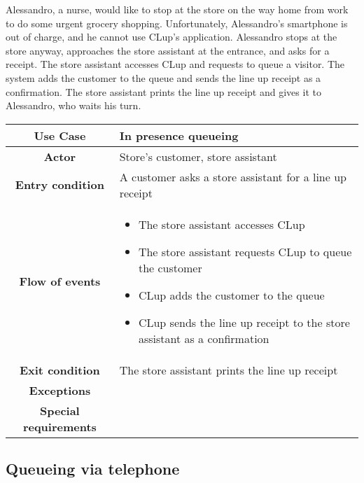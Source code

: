 \documentclass[../../main.tex]{subfiles}
\begin{document}
    Alessandro, a nurse, would like to stop at the store on the way home from work to do some urgent grocery shopping. 
    Unfortunately, Alessandro's smartphone is out of charge, and he cannot use CLup's application. 
    Alessandro stops at the store anyway, approaches the store assistant at the entrance, and asks for a receipt. 
    The store assistant accesses CLup and requests to queue a visitor. The system adds the customer to the queue and sends the line up receipt as a confirmation. 
    The store assistant prints the line up receipt and gives it to Alessandro, who waits his turn.

    \begin{table}[H]
      \centering
        \begin{tabular}{c m{}}
        \hline
        \textbf{Use Case} & In presence queueing\\ \hline
        \textbf{Actor} & Store's customer, store assistant\\ \hline
        \textbf{Entry condition} & A customer asks a store assistant for a line up receipt\\  \hline
        \textbf{Flow of events} & \begin{itemize}
                                    \item The store assistant accesses CLup
                                    \item The store assistant requests CLup to queue the customer
                                    \item CLup adds the customer to the queue
                                    \item CLup sends the line up receipt to the store assistant as a confirmation
                                  \end{itemize}\\ \hline
        \textbf{Exit condition} & The store assistant prints the line up receipt \\ \hline
        \textbf{Exceptions} & \\ \hline
        \textbf{Special requirements} &\\ \hline
        \end{tabular}
    \end{table}

    \subsection{Queueing via telephone}
\end{document}
